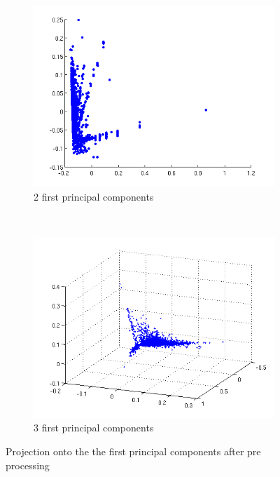 \documentclass[a4paper,10pt]{article}
\begin{document}
\begin{figure}[h!]
        \centering
        \begin{subfigure}[b]{0.5\textwidth}
                \includegraphics[width=\textwidth]{Images/processed.png}
                \caption{2 first principal components}
    			\label{fig:pca2}
        \end{subfigure}%
        ~ %
        \begin{subfigure}[b]{0.5\textwidth}
                \includegraphics[width=\textwidth]{Images/pca3d.png}
                \caption{3 first principal components}
                \label{fig:pca3}
        \end{subfigure}
        \caption{Projection onto the the first principal components after pre processing}
        \label{fig:pca}
\end{figure}
\end{document}
